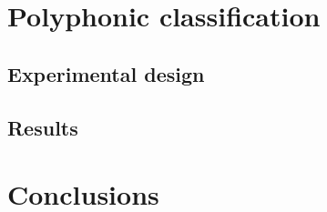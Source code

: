 \documentclass{article}
\begin{document}
\section{Polyphonic classification}\label{sec:polyphonic}
\subsection{Experimental design}

\subsection{Results}


\section{Conclusions}


\end{document}
